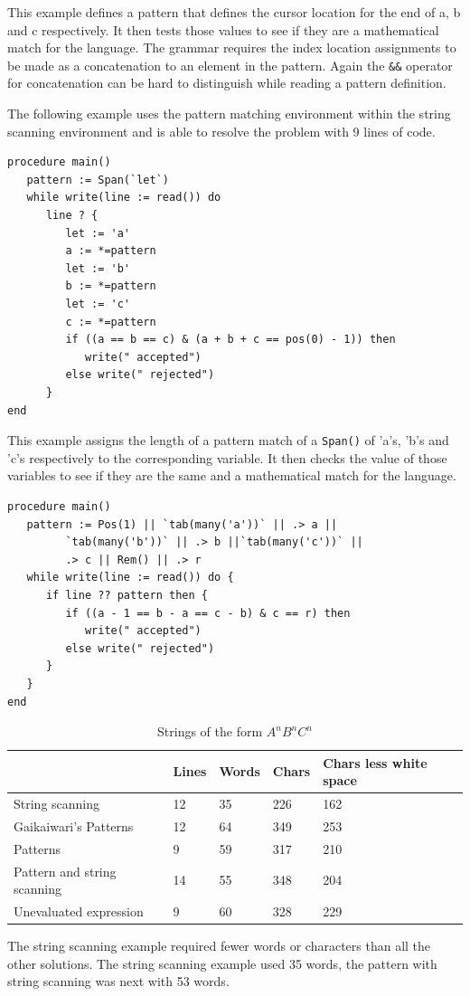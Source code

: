 \documentclass{article}
\begin{document}
This example defines a pattern that defines the cursor location for the end of a, b and c respectively.  It then tests those values to see if they are a mathematical match for the language.  The grammar requires the index location assignments to be made as a concatenation to an element in the pattern.  Again the \texttt{\&\&} operator for concatenation can be hard to distinguish while reading a pattern definition.

The following example uses the pattern matching environment within the string scanning environment and is able to resolve the problem with 9 lines of code.\\
\begin{verbatim}
procedure main()
   pattern := Span(`let`)
   while write(line := read()) do
      line ? {
         let := 'a'
         a := *=pattern
         let := 'b'
         b := *=pattern
         let := 'c'
         c := *=pattern
         if ((a == b == c) & (a + b + c == pos(0) - 1)) then 
            write(" accepted")
         else write(" rejected")
      }
end
\end{verbatim}
This example assigns the length of a pattern match of a \texttt{Span()} of 'a's, 'b's and 'c's respectively to the corresponding variable.  It then checks the value of those variables to see if they are the same and a mathematical match for the language.

\begin{verbatim}
procedure main()
   pattern := Pos(1) || `tab(many('a'))` || .> a ||
         `tab(many('b'))` || .> b ||`tab(many('c'))` || 
         .> c || Rem() || .> r
   while write(line := read()) do {
      if line ?? pattern then {
         if ((a - 1 == b - a == c - b) & c == r) then 
            write(" accepted")
         else write(" rejected")
      }
   }
end
\end{verbatim}

\begin{table}[ht]
	\caption{Strings of the form \emph{$A^nB^nC^n$}}
	\centering
	\begin{tabular}{|l|l|l|l|l|}
		\hline\hline
		 & Lines & Words & Chars & Chars less white space\\
		\hline
		String scanning & 12 & 35 & 226 & 162 \\
		Gaikaiwari's Patterns & 12 & 64 & 349 & 253 \\
		Patterns & 9 & 59 & 317 & 210 \\
		Pattern and string scanning & 14 & 55 & 348 & 204 \\
		Unevaluated expression & 9 & 60 & 328 & 229 \\
		\hline
	\end{tabular}
\end{table}
The string scanning example required fewer words or characters than all the other solutions.  The string scanning example used 35 words, the pattern with string scanning was next with 53 words.   
\end{document}
